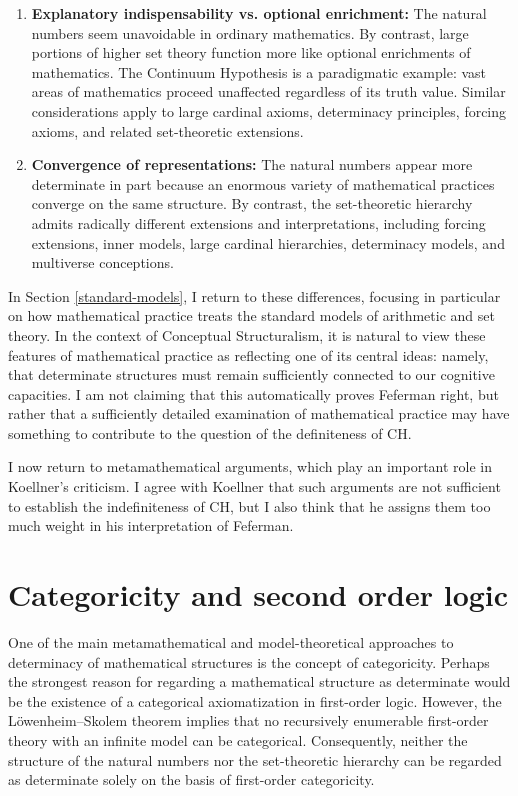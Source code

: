 \documentclass[11pt,a4paper]{article}
\theoremstyle{plain}
\begin{document}
\begin{enumerate}
  \item \textbf{Explanatory indispensability vs. optional enrichment:} The natural numbers seem unavoidable in ordinary mathematics. By contrast, large portions of higher set theory function more like optional enrichments of mathematics. The Continuum Hypothesis is a paradigmatic example: vast areas of mathematics proceed unaffected regardless of its truth value. Similar considerations apply to large cardinal axioms, determinacy principles, forcing axioms, and related set-theoretic extensions.
  
  \item \textbf{Convergence of representations:} The natural numbers appear more determinate in part because an enormous variety of mathematical practices converge on the same structure. By contrast, the set-theoretic hierarchy admits radically different extensions and interpretations, including forcing extensions, inner models, large cardinal hierarchies, determinacy models, and multiverse conceptions.
  
\end{enumerate}

In Section \ref{standard-models}, I return to these differences, focusing in particular on how mathematical practice treats the standard models of arithmetic and set theory. In the context of Conceptual Structuralism, it is natural to view these features of mathematical practice as reflecting one of its central ideas: namely, that determinate structures must remain sufficiently connected to our cognitive capacities. I am not claiming that this automatically proves Feferman right, but rather that a sufficiently detailed examination of mathematical practice may have something to contribute to the question of the definiteness of CH.

I now return to metamathematical arguments, which play an important role in Koellner's criticism. I agree with Koellner that such arguments are not sufficient to establish the indefiniteness of CH, but I also think that he assigns them too much weight in his interpretation of Feferman.


\section{Categoricity and second order logic}
\label{categoricity-second-order-logic}

One of the main metamathematical and model-theoretical approaches to determinacy of mathematical structures is the concept of categoricity. Perhaps the strongest reason for regarding a mathematical structure as determinate would be the existence of a categorical axiomatization in first-order logic. However, the Löwenheim--Skolem theorem implies that no recursively enumerable first-order theory with an infinite model can be categorical. Consequently, neither the structure of the natural numbers nor the set-theoretic hierarchy can be regarded as determinate solely on the basis of first-order categoricity.
\end{document}
